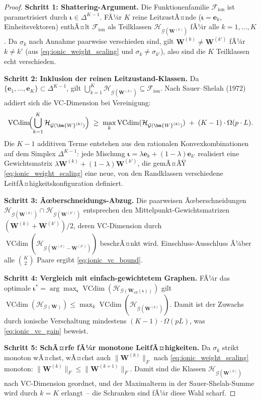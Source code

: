 ﻿\documentclass[12pt, a4paper, openany]{report}
\newcommand{\calG}{\mathcal{G}}
\newcommand{\calH}{\mathcal{H}}
\newcommand{\calF}{\mathcal{F}}
\DeclareMathOperator{\VC}{VCdim}
\begin{document}
\begin{proof}
\textbf{Schritt 1: Shattering-Argument.}
Die Funktionenfamilie $\calF_{\mathrm{ion}}$ ist parametrisiert durch
$\bm{\iota} \in \Delta^{K-1}$.  FÃ¼r $K$ reine LeitzustÃ¤nde
($\bm{\iota} = \bm{e}_k$, Einheitsvektoren) enthÃ¤lt $\calF_{\mathrm{ion}}$
als Teilklassen $\calH_{\calG(\bm{W}^{(k)})}$ fÃ¼r alle $k = 1, \ldots, K$.
Da $\sigma_k$ nach Annahme paarweise verschieden sind, gilt
$\bm{W}^{(k)} \neq \bm{W}^{(k')}$ fÃ¼r $k \neq k'$
(aus \eqref{eq:ionic_weight_scaling} und $\sigma_k \neq \sigma_{k'}$),
also sind die $K$ Teilklassen echt verschieden.

\textbf{Schritt 2: Inklusion der reinen Leitzustand-Klassen.}
Da $\{\bm{e}_1, \ldots, \bm{e}_K\} \subset \Delta^{K-1}$, gilt
$\bigcup_{k=1}^K \calH_{\calG(\bm{W}^{(k)})} \subseteq \calF_{\mathrm{ion}}$.
Nach Sauer--Shelah (1972) addiert sich die VC-Dimension bei Vereinigung:
\[
  \VC\!\Bigl(\bigcup_{k=1}^K \calH_{\calG(\bm{W}^{(k)})}\Bigr)
  \;\geq\;
  \max_k \VC(\calH_{\calG(\bm{W}^{(k)})})
  \;+\;
  (K-1)\cdot \Omega(p \cdot L).
\]
Die $K-1$ additiven Terme entstehen aus den rationalen Konvexkombinationen
auf dem Simplex $\Delta^{K-1}$: jede Mischung $\bm{\iota} = \lambda\bm{e}_k +
(1-\lambda)\bm{e}_{k'}$ realisiert eine Gewichtsmatrix
$\lambda\bm{W}^{(k)} + (1-\lambda)\bm{W}^{(k')}$, die gemÃ¤ÃŸ
\eqref{eq:ionic_weight_scaling} eine neue, von den Randklassen verschiedene
LeitfÃ¤higkeitskonfiguration definiert.

\textbf{Schritt 3: Ãœberschneidungs-Abzug.}
Die paarweisen Ãœberschneidungen $\calH_{\calG(\bm{W}^{(k)})} \cap
\calH_{\calG(\bm{W}^{(k')})}$ entsprechen den Mittelpunkt-Gewichtsmatrizen
$(\bm{W}^{(k)} + \bm{W}^{(k')})/2$, deren VC-Dimension durch
$\VC(\calH_{\calG(\bm{W}^{(k)}-\bm{W}^{(k')})})$ beschrÃ¤nkt wird.
Einschluss-Ausschluss Ã¼ber alle $\binom{K}{2}$ Paare ergibt \eqref{eq:ionic_vc_bound}.

\textbf{Schritt 4: Vergleich mit einfach-gewichtetem Graphen.}
FÃ¼r das optimale $\bm{\iota}^* = \arg\max_{\bm\iota}
\VC(\calH_{\calG(\bm{W}_{\mathrm{eff}}(\bm\iota))})$ gilt
$\VC(\calH_{\calG(\bm{W})}) \leq \max_k \VC(\calH_{\calG(\bm{W}^{(k)})})$.
Damit ist der Zuwachs durch ionische Verschaltung mindestens
$(K-1)\cdot\Omega(pL)$, was \eqref{eq:ionic_vc_gain} beweist.

\textbf{Schritt 5: SchÃ¤rfe fÃ¼r monotone LeitfÃ¤higkeiten.}
Da $\sigma_k$ strikt monoton wÃ¤chst, wÃ¤chst auch $\|\bm{W}^{(k)}\|_F$
nach \eqref{eq:ionic_weight_scaling} monoton: $\|\bm{W}^{(k)}\|_F \leq
\|\bm{W}^{(k+1)}\|_F$.  Damit sind die Klassen $\calH_{\calG(\bm{W}^{(k)})}$
nach VC-Dimension geordnet, und der Maximalterm in der Sauer-Shelah-Summe
wird durch $k = K$ erlangt~-- die Schranken sind fÃ¼r diese Wahl scharf.
\end{proof}
\end{document}
